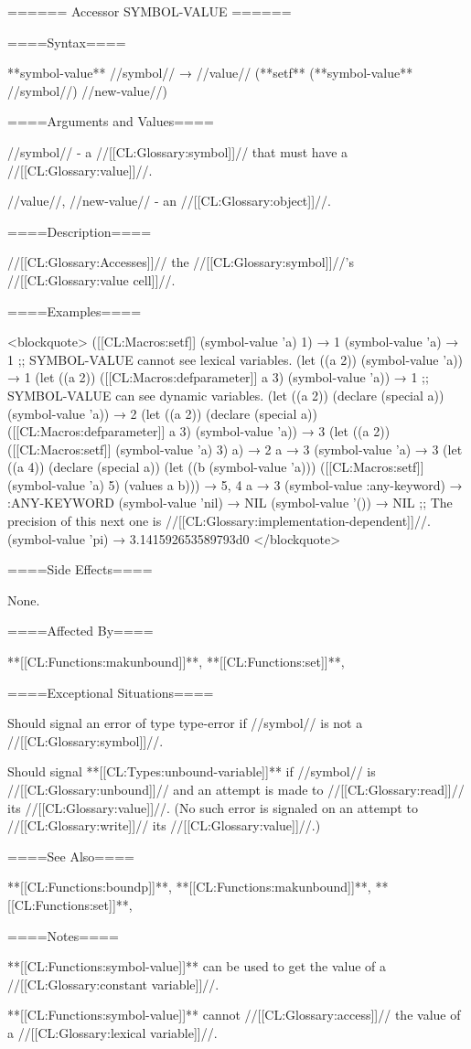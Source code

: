 ====== Accessor SYMBOL-VALUE ======

====Syntax====

**symbol-value** //symbol// → //value// (**setf** (**symbol-value** //symbol//) //new-value//)

====Arguments and Values====

//symbol// - a //[[CL:Glossary:symbol]]// that must have a //[[CL:Glossary:value]]//.

//value//, //new-value// - an //[[CL:Glossary:object]]//.

====Description====

//[[CL:Glossary:Accesses]]// the //[[CL:Glossary:symbol]]//'s //[[CL:Glossary:value cell]]//.

====Examples====

<blockquote> ([[CL:Macros:setf]] (symbol-value 'a) 1) → 1 (symbol-value 'a) → 1 ;; SYMBOL-VALUE cannot see lexical variables. (let ((a 2)) (symbol-value 'a)) → 1 (let ((a 2)) ([[CL:Macros:defparameter]] a 3) (symbol-value 'a)) → 1 ;; SYMBOL-VALUE can see dynamic variables. (let ((a 2)) (declare (special a)) (symbol-value 'a)) → 2 (let ((a 2)) (declare (special a)) ([[CL:Macros:defparameter]] a 3) (symbol-value 'a)) → 3 (let ((a 2)) ([[CL:Macros:setf]] (symbol-value 'a) 3) a) → 2 a → 3 (symbol-value 'a) → 3 (let ((a 4)) (declare (special a)) (let ((b (symbol-value 'a))) ([[CL:Macros:setf]] (symbol-value 'a) 5) (values a b))) → 5, 4 a → 3 (symbol-value :any-keyword) → :ANY-KEYWORD (symbol-value 'nil) → NIL (symbol-value '()) → NIL ;; The precision of this next one is //[[CL:Glossary:implementation-dependent]]//. (symbol-value 'pi) → 3.141592653589793d0 </blockquote>

====Side Effects====

None.

====Affected By====

**[[CL:Functions:makunbound]]**, **[[CL:Functions:set]]**, 

====Exceptional Situations====

Should signal an error of type type-error if //symbol// is not a //[[CL:Glossary:symbol]]//.

Should signal **[[CL:Types:unbound-variable]]** if //symbol// is //[[CL:Glossary:unbound]]// and an attempt is made to //[[CL:Glossary:read]]// its //[[CL:Glossary:value]]//. (No such error is signaled on an attempt to //[[CL:Glossary:write]]// its //[[CL:Glossary:value]]//.)

====See Also====

**[[CL:Functions:boundp]]**, **[[CL:Functions:makunbound]]**, **[[CL:Functions:set]]**, 

====Notes====

**[[CL:Functions:symbol-value]]** can be used to get the value of a //[[CL:Glossary:constant variable]]//.

**[[CL:Functions:symbol-value]]** cannot //[[CL:Glossary:access]]// the value of a //[[CL:Glossary:lexical variable]]//.

